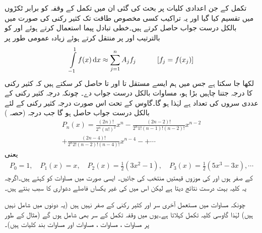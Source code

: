 تکمل کے جن اعدادی کلیات پر بحث کی گئی ان میں تکمل کے وقفہ کو برابر ٹکڑوں میں تقسیم کیا گیا اور یہ تراکیب کسی مخصوص طاقت تک کثیر رکنی کی صورت میں بالکل درست جواب حاصل کرتے ہیں۔خطی تبادل پیما استعمال کرتے ہوئے  اور  کو بالترتیب  اور  پر منتقل کرتے ہوئے زیادہ عمومی طور پر
\begin{align}\label{مساوات_اعدادی_قاعدہ_عمومی_الف}
\int\limits_{-1}^{1}f(x)\dif x\approx \sum\limits_{j=1}^{n} A_jf_j\quad \quad \quad [f_j=f(x_j)]
\end{align}   
لکھا جا سکتا ہے جس میں ہم ایسے  مستقل  تا  اور  تا  حاصل کر سکتے ہیں کہ کثیر رکنی کا درجہ  جتنا چاہیں بڑا ہو، مساوات  بالکل درست جواب دے۔ چونکہ درجہ  کثیر رکنی کے عددی سروں کی تعداد  ہے لہٰذا  ہو گا۔گاوس کے تحت اس صورت درجہ  کثیر رکنی کے لئے  بالکل درست جواب حاصل ہو گا جب  درجہ   (حصہ )
\begin{multline*}
P_n(x)=\frac{(2n)!}{2^n(n!)^2}x^n-\frac{(2n-2)!}{2^n 1!(n-1)!(n-2)!}x^{n-2}\\
+\frac{(2n-4)!}{2^n2!(n-2)!(n-4)!}x^{n-4}-+\cdots
\end{multline*}
یعنی
\begin{align*}
P_0=1,\quad P_1(x)=x,\quad P_2(x)=\frac{1}{2}(3x^2-1),\quad P_3(x)=\frac{1}{2}(5x^3-3x),\cdots
\end{align*}
 کے  صفر ہوں اور   کی موزوں قیمتیں منتخب کی جائیں۔ ایسی صورت میں مساوات  کو  کہتے ہیں۔اگرچہ یہ کلیہ بہت درست نتائج دیتا ہے لیکن اس میں  کی غیر یکساں فاصلے  دشواری کا سبب بنتے ہیں۔

چونکہ مساوات  میں مستعمل آخری سر  اور  کثیر رکنی  کے صفر نہیں ہیں (یہ دونوں  میں شامل نہیں ہیں) لہٰذا گاوسی کلیہ تکمل  کہلاتا ہے۔یوں  میں وقفہ تکمل کے سر بھی شامل ہوں گے (مثال کے طور پر مساوات ، مساوات ، مساوات  اور مساوات  بند کلیات ہیں)۔  

